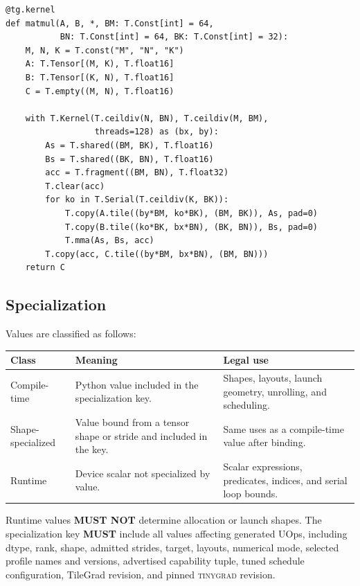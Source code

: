 \documentclass[10pt,letterpaper]{article}
\newcommand{\tinygrad}{\textsc{tinygrad}}
\newcommand{\must}{\textbf{MUST}}
\newcommand{\mustnot}{\textbf{MUST NOT}}
\begin{document}
\begin{lstlisting}
@tg.kernel
def matmul(A, B, *, BM: T.Const[int] = 64,
           BN: T.Const[int] = 64, BK: T.Const[int] = 32):
    M, N, K = T.const("M", "N", "K")
    A: T.Tensor[(M, K), T.float16]
    B: T.Tensor[(K, N), T.float16]
    C = T.empty((M, N), T.float16)

    with T.Kernel(T.ceildiv(N, BN), T.ceildiv(M, BM),
                  threads=128) as (bx, by):
        As = T.shared((BM, BK), T.float16)
        Bs = T.shared((BK, BN), T.float16)
        acc = T.fragment((BM, BN), T.float32)
        T.clear(acc)
        for ko in T.Serial(T.ceildiv(K, BK)):
            T.copy(A.tile((by*BM, ko*BK), (BM, BK)), As, pad=0)
            T.copy(B.tile((ko*BK, bx*BN), (BK, BN)), Bs, pad=0)
            T.mma(As, Bs, acc)
        T.copy(acc, C.tile((by*BM, bx*BN), (BM, BN)))
    return C
\end{lstlisting}

\subsection*{Specialization}

Values are classified as follows:

\begin{center}
\begin{tabularx}{\textwidth}{@{}lYY@{}}
\toprule
\textbf{Class} & \textbf{Meaning} & \textbf{Legal use} \\
\midrule
Compile-time & Python value included in the specialization key. & Shapes,
layouts, launch geometry, unrolling, and scheduling. \\
Shape-specialized & Value bound from a tensor shape or stride and included in
the key. & Same uses as a compile-time value after binding. \\
Runtime & Device scalar not specialized by value. & Scalar expressions,
predicates, indices, and serial loop bounds. \\
\bottomrule
\end{tabularx}
\end{center}

Runtime values \mustnot{} determine allocation or launch shapes. The
specialization key \must{} include all values affecting generated UOps,
including dtype, rank, shape, admitted strides, target, layouts, numerical
mode, selected profile names and versions, advertised capability tuple, tuned
schedule configuration, TileGrad revision, and pinned \tinygrad{} revision.
\end{document}
